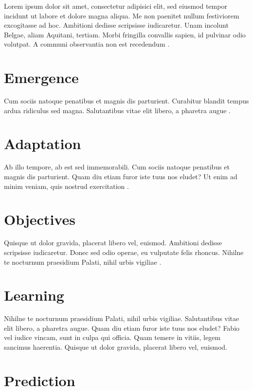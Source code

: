 Lorem ipsum dolor sit amet, consectetur adipisici elit, sed eiusmod tempor incidunt ut labore et dolore magna aliqua. Me non paenitet nullum festiviorem excogitasse ad hoc. Ambitioni dedisse scripsisse iudicaretur. Unam incolunt Belgae, aliam Aquitani, tertiam. Morbi fringilla convallis sapien, id pulvinar odio volutpat. A communi observantia non est recedendum \autocite{zurell2010}.

\section{Emergence}

Cum sociis natoque penatibus et magnis dis parturient. Curabitur blandit tempus ardua ridiculus sed magna. Salutantibus vitae elit libero, a pharetra augue \autocite{railsback2019a}.

\section{Adaptation}

Ab illo tempore, ab est sed immemorabili. Cum sociis natoque penatibus et magnis dis parturient. Quam diu etiam furor iste tuus nos eludet? Ut enim ad minim veniam, quis nostrud exercitation \autocite{grimm2020a}.

\section{Objectives}

Quisque ut dolor gravida, placerat libero vel, euismod. Ambitioni dedisse scripsisse iudicaretur. Donec sed odio operae, eu vulputate felis rhoncus. Nihilne te nocturnum praesidium Palati, nihil urbis vigiliae \autocite{szangolies2024}.

\section{Learning}

Nihilne te nocturnum praesidium Palati, nihil urbis vigiliae. Salutantibus vitae elit libero, a pharetra augue. Quam diu etiam furor iste tuus nos eludet? Fabio vel iudice vincam, sunt in culpa qui officia. Quam temere in vitiis, legem sancimus haerentia. Quisque ut dolor gravida, placerat libero vel, euismod\autocite{grimm2025}.

\section{Prediction}

